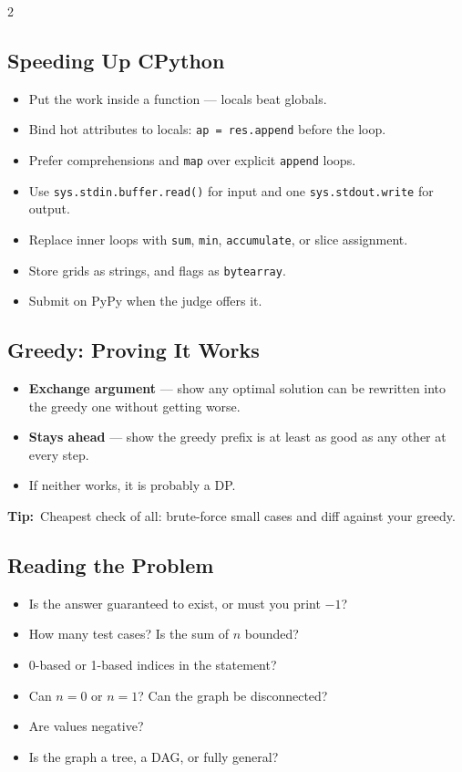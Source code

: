 \documentclass[10pt]{article}
\newcommand{\code}[1]{\texttt{\small #1}}
\newcommand{\tip}[1]{{\color{tipc}\footnotesize\textbf{Tip:}}~{\footnotesize #1}\par}
\begin{document}
\begin{multicols}{2}
\subsection{Speeding Up CPython}
\begin{itemize}
    \item Put the work inside a function --- locals beat globals.
    \item Bind hot attributes to locals:
          \code{ap = res.append} before the loop.
    \item Prefer comprehensions and \code{map} over explicit
          \code{append} loops.
    \item Use \code{sys.stdin.buffer.read()} for input and one
          \code{sys.stdout.write} for output.
    \item Replace inner loops with \code{sum}, \code{min},
          \code{accumulate}, or slice assignment.
    \item Store grids as strings, and flags as \code{bytearray}.
    \item Submit on PyPy when the judge offers it.
\end{itemize}

\subsection{Greedy: Proving It Works}
\begin{itemize}
    \item \textbf{Exchange argument} --- show any optimal solution can be
          rewritten into the greedy one without getting worse.
    \item \textbf{Stays ahead} --- show the greedy prefix is at least as
          good as any other at every step.
    \item If neither works, it is probably a DP.
\end{itemize}
\tip{Cheapest check of all: brute-force small cases and diff against
your greedy.}

\subsection{Reading the Problem}
\begin{itemize}
    \item Is the answer guaranteed to exist, or must you print $-1$?
    \item How many test cases? Is the sum of $n$ bounded?
    \item 0-based or 1-based indices in the statement?
    \item Can $n = 0$ or $n = 1$? Can the graph be disconnected?
    \item Are values negative?
    \item Is the graph a tree, a DAG, or fully general?
\end{itemize}


\end{multicols}
\end{document}
